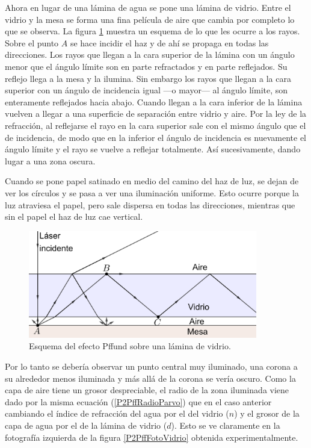 \documentclass[12pt]{article}
\numberwithin{table}{section}
\numberwithin{figure}{section}
\numberwithin{equation}{section}
\begin{document}
Ahora en lugar de una lámina de agua se pone una lámina de vidrio. Entre el vidrio y la mesa se forma una fina película de aire que cambia por completo lo que se observa. La figura \ref{P2PffVidrio} muestra un esquema de lo que les ocurre a los rayos. Sobre el punto $A$ se hace incidir el haz y de ahí se propaga en todas las direcciones. Los rayos que llegan a la cara superior de la lámina con un ángulo menor que el ángulo límite son en parte refractados y en parte reflejados. Su reflejo llega a la mesa y la ilumina. Sin embargo los rayos que llegan a la cara superior con un ángulo de incidencia igual ---o mayor--- al ángulo límite, son enteramente reflejados hacia abajo. Cuando llegan a la cara inferior de la lámina vuelven a llegar a una superficie de separación entre vidrio y aire. Por la ley de la refracción, al reflejarse el rayo en la cara superior sale con el mismo ángulo que el de incidencia, de modo que en la inferior el ángulo de incidencia es nuevamente el ángulo límite y el rayo se vuelve a reflejar totalmente. Así sucesivamente, dando lugar a una zona oscura.

Cuando se pone papel satinado en medio del camino del haz de luz, se dejan de ver los círculos y se pasa a ver una iluminación uniforme. Esto ocurre porque la luz atraviesa el papel, pero sale dispersa en todas las direcciones, mientras que sin el papel el haz de luz cae vertical.

\begin{figure}[!ht]
	\small \centering \sffamily
	\begin{center}
		\includegraphics[width=10cm]{P2PffVidrio.png}
		\caption{Esquema del efecto Pffund sobre una lámina de vidrio.}
		\label{P2PffVidrio}
	\end{center}
\end{figure}

Por lo tanto se debería observar un punto central muy iluminado, una corona a su alrededor menos iluminada y más allá de la corona se vería oscuro. Como la capa de aire tiene un grosor despreciable, el radio de la zona iluminada viene dado por la misma ecuación (\ref{P2PffRadioParvo}) que en el caso anterior cambiando el índice de refracción del agua por el del vidrio ($n$) y el grosor de la capa de agua por el de la lámina de vidrio ($d$). Esto se ve claramente en la fotografía izquierda de la figura \ref{P2PffFotoVidrio} obtenida experimentalmente.
\end{document}
